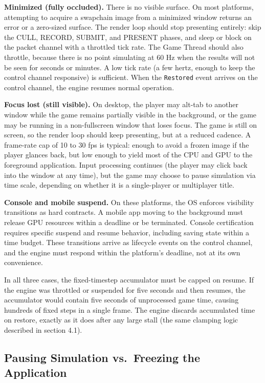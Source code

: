\documentclass[
  11pt,
  letterpaper,
  DIV=11,
  numbers=noendperiod,
  twoside,
  open=right]{scrreprt}
\begin{document}
\textbf{Minimized (fully occluded).} There is no visible surface. On
most platforms, attempting to acquire a swapchain image from a minimized
window returns an error or a zero-sized surface. The render loop should
stop presenting entirely: skip the CULL, RECORD, SUBMIT, and PRESENT
phases, and sleep or block on the packet channel with a throttled tick
rate. The Game Thread should also throttle, because there is no point
simulating at 60 Hz when the results will not be seen for seconds or
minutes. A low tick rate (a few hertz, enough to keep the control
channel responsive) is sufficient. When the \texttt{Restored} event
arrives on the control channel, the engine resumes normal operation.

\textbf{Focus lost (still visible).} On desktop, the player may alt-tab
to another window while the game remains partially visible in the
background, or the game may be running in a non-fullscreen window that
loses focus. The game is still on screen, so the render loop should keep
presenting, but at a reduced cadence. A frame-rate cap of 10 to 30 fps
is typical: enough to avoid a frozen image if the player glances back,
but low enough to yield most of the CPU and GPU to the foreground
application. Input processing continues (the player may click back into
the window at any time), but the game may choose to pause simulation via
time scale, depending on whether it is a single-player or multiplayer
title.

\textbf{Console and mobile suspend.} On these platforms, the OS enforces
visibility transitions as hard contracts. A mobile app moving to the
background must release GPU resources within a deadline or be
terminated. Console certification requires specific suspend and resume
behavior, including saving state within a time budget. These transitions
arrive as lifecycle events on the control channel, and the engine must
respond within the platform's deadline, not at its own convenience.

In all three cases, the fixed-timestep accumulator must be capped on
resume. If the engine was throttled or suspended for five seconds and
then resumes, the accumulator would contain five seconds of unprocessed
game time, causing hundreds of fixed steps in a single frame. The engine
discards accumulated time on restore, exactly as it does after any large
stall (the same clamping logic described in section 4.1).

\subsection{Pausing Simulation vs.~Freezing the
Application}\label{pausing-simulation-vs.-freezing-the-application}
\end{document}
